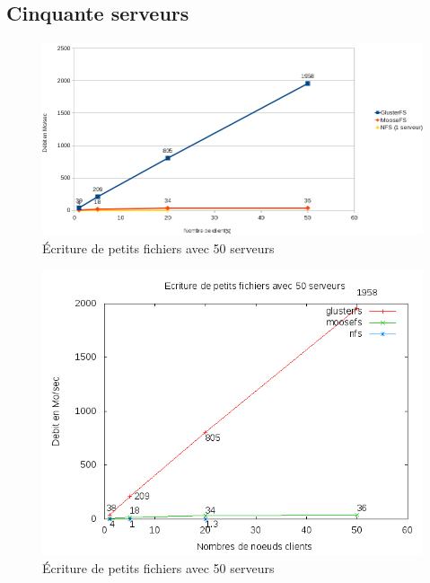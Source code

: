 \documentclass[12pt]{report}
\begin{document}
			\subsection{Cinquante serveurs}


		        \begin{figure}[H]
			        \begin{center}
				        \includegraphics[width=1\linewidth]{graph/calc/50WS.png}
				        \caption{Écriture de petits fichiers avec 50 serveurs}
			        \end{center}
		        \end{figure}
\begin{figure}[H]
\begin{center}
\includegraphics[bb=0 0 640 480,width=14cm]{images/srv50ws.png}
\caption{Écriture de petits fichiers avec 50 serveurs}
\end{center}
\end{figure} 
\end{document}
